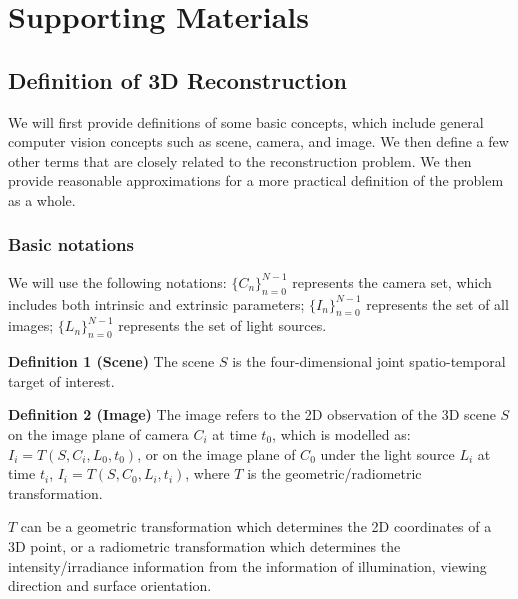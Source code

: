 
\chapter{Supporting Materials}


\section{Definition of 3D Reconstruction}
\label{sec:3DRecon_Def}
We will first provide definitions of some basic concepts, which include general computer vision concepts such as scene, camera, and image. We then define a few other terms that are closely related to the reconstruction problem. We then provide reasonable approximations for a more practical definition of the problem as a whole.

\subsection{Basic notations}
We will use the following notations: $\{C_n\}_{n=0}^{N-1}$ represents the camera set, which includes both intrinsic and extrinsic parameters; $\{I_n\}_{n=0}^{N-1}$ represents the set of all images; $\{L_n\}_{n=0}^{N-1}$ represents the set of light sources.

\noindent\textbf{Definition 1 (Scene)} The scene $S$ is the four-dimensional joint spatio-temporal target of interest.

\noindent\textbf{Definition 2 (Image)} The image refers to the 2D observation of the 3D scene $S$ on the image plane of camera $C_i$ at time $t_0$, which is modelled as: $I_i = T(S, C_i, L_0, t_0)$, or on the image plane of $C_0$  under the light source $L_i$ at time $t_i$, $I_i= T(S, C_0, L_i, t_i)$, where $T$ is the geometric/radiometric transformation.

$T$ can be a geometric transformation which determines the 2D coordinates of a 3D point, or a radiometric transformation which determines the intensity/irradiance information from the information of illumination, viewing direction and surface orientation.


